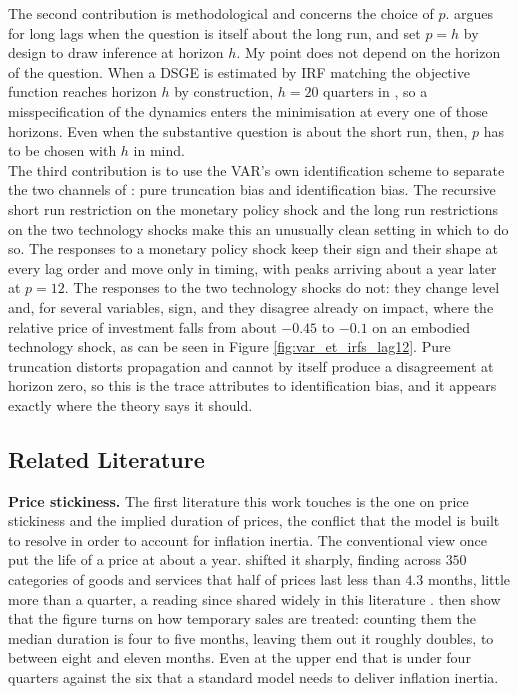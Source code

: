 \documentclass[12pt, a4paper]{article}
\begin{document}
The second contribution is methodological and concerns the choice of $p$. \citet{Baumeister2025}
argues for long lags when the question is itself about the long run, and
\citet{Antolin-Diaz_Surico2025} set $p = h$ by design to draw inference at horizon $h$. My point
does not depend on the horizon of the question. When a DSGE is estimated by IRF matching the
objective function reaches horizon $h$ by construction, $h = 20$ quarters in \citet{ACEL2011}, so a
misspecification of the dynamics enters the minimisation at every one of those horizons. Even when
the substantive question is about the short run, then, $p$ has to be chosen with $h$ in mind.
\\

The third contribution is to use the VAR's own identification scheme to separate the two channels
of \citet{Ravenna2007}: pure truncation bias and identification bias. The recursive short run
restriction on the monetary policy shock and the long run restrictions on the two technology shocks
make this an unusually clean setting in which to do so. The responses to a monetary policy shock
keep their sign and their shape at every lag order and move only in timing, with peaks arriving
about a year later at $p = 12$. The responses to the two technology shocks do not: they change
level and, for several variables, sign, and they disagree already on impact, where the relative
price of investment falls from about $-0.45$ to $-0.1$ on an embodied technology shock, as can be
seen in Figure \ref{fig:var_et_irfs_lag12}. Pure truncation distorts propagation and cannot by
itself produce a disagreement at horizon zero, so this is the trace \citet{Ravenna2007} attributes
to identification bias, and it appears exactly where the theory says it should.

\subsection{Related Literature}
\textbf{Price stickiness.}
The first literature this work touches is the one on price stickiness and the implied duration of
prices, the conflict that the \citet{ACEL2011} model is built to resolve in order to account for
inflation inertia. The conventional view once put the life of a price at about a year.
\citet{BilsKlenow2004} shifted it sharply, finding across $350$ categories of goods and services
that half of prices last less than $4.3$ months, little more than a quarter, a reading since
shared widely in this literature \citep{GolosovLucas2007, KlenowKryvtsov2008}.
\citet{NakamuraSteinsson2008} then show that the figure turns on how temporary sales are treated:
counting them the median duration is four to five months, leaving them out it roughly doubles, to
between eight and eleven months. Even at the upper end that is under four quarters against the
six that a standard model needs to deliver inflation inertia.
\\
\end{document}
